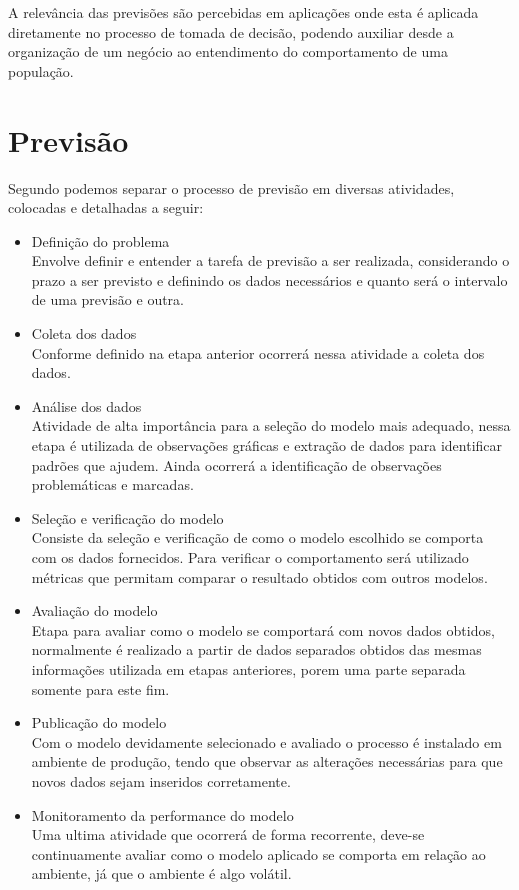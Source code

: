 \documentclass[
	12pt,
	oneside,
	a4paper,
	english,
	brazil
]{abntex2}
\begin{document}
A relevância das previsões são percebidas em aplicações onde esta é aplicada 
diretamente no processo de tomada de decisão, podendo auxiliar desde a 
organização de um negócio ao entendimento do comportamento de uma população.

\chapter{Previsão}
Segundo  podemos separar o processo de previsão em diversas 
atividades, colocadas e detalhadas a seguir:

\begin{itemize}
	\item Definição do problema\\
		Envolve definir e entender a tarefa de previsão a ser realizada,
		considerando o prazo a ser previsto e definindo os dados necessários e
		quanto será o intervalo de uma previsão e outra.
	\item Coleta dos dados\\
		Conforme definido na etapa anterior ocorrerá nessa atividade a coleta
		dos dados.
	\item Análise dos dados\\
		Atividade de alta importância para a seleção do modelo mais adequado,
		nessa etapa é utilizada de observações gráficas e extração de dados para
		identificar padrões que ajudem. Ainda ocorrerá a identificação de 
		observações problemáticas e marcadas.
	\item Seleção e verificação do modelo\\
		Consiste da seleção e verificação de como o modelo escolhido se comporta 
		com os dados fornecidos. Para verificar o comportamento será utilizado 
		métricas que permitam comparar o resultado obtidos com outros modelos.
	\item Avaliação do modelo\\
		Etapa para avaliar como o modelo se comportará com novos dados obtidos, 
		normalmente é realizado a partir de dados separados obtidos das mesmas 
		informações utilizada em etapas anteriores, porem uma parte separada 
		somente para este fim.
	\item Publicação do modelo\\
		Com o modelo devidamente selecionado e avaliado o processo é instalado 
		em ambiente de produção, tendo que observar as alterações necessárias 
		para que novos dados sejam inseridos corretamente.
	\item Monitoramento da performance do modelo\\
		Uma ultima atividade que ocorrerá de forma recorrente, deve-se 
		continuamente avaliar como o modelo aplicado se comporta em relação ao 
		ambiente, já que o ambiente é algo volátil.
\end{itemize}
\end{document}
